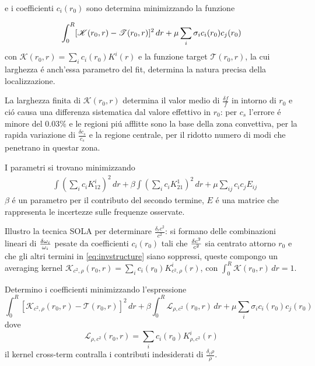 \documentclass[../main.tex]{subfiles}
\begin{document}
e i coefficienti $c_i(r_0)$ sono determina minimizzando la funzione

\begin{equation}\label{eq:SOLAcir0min}
\int_0^R[\mathcal{K}(r_0,r)-\mathcal{T}(r_0,r)]^2\,dr+\mu\sum_i\sigma_ic_i(r_0)c_j(r_0)\\
\end{equation}
con $\mathcal{K}(r_0,r)=\sum_ic_i(r_0)K^i(r)$ e la funzione target $\mathcal{T}(r_0,r)$, la cui larghezza \'e anch'essa parametro del fit, determina la natura precisa della localizzazione.

La larghezza finita di $\mathcal{K}(r_0,r)$ determina il valor medio di $\frac{\delta f}{f}$ in intorno di $r_0$ e ci\'o causa una differenza sistematica  dal valore effettivo in $r_0$: per $c_s$ l'errore \'e minore del $0.03\%$ e le regioni pi\'u afflitte sono la base della zona convettiva, per la rapida variazione di $\frac{\delta c_s}{c_s}$ e la regione centrale, per il ridotto numero di modi che penetrano in questar zona.


\begin{errata}
I parametri si trovano minimizzando
\begin{align*}
&\int(\sum_ic_iK_{12}^i)^2\,dr+\beta\int(\sum_ic_iK_{21}^1)^2\,dr+\mu\sum_{ij}c_ic_jE_{ij}
\end{align*}
$\beta$ \'e un parametro per il contributo del secondo termine, $E$ \'e una matrice che rappresenta le incertezze sulle frequenze osservate.

\end{errata}

Illustro la tecnica SOLA per determinare $\frac{\delta_rc^2}{c^2}$: si formano delle combinazioni lineari di $\frac{\delta \omega_i}{\omega_i}$ pesate da coefficienti $c_i(r_0)$ tali che $\frac{\delta c^2}{c^2}$ sia centrato attorno $r_0$ e che gli altri termini in \eqref{eq:invstructure} siano soppressi, queste compongo un averaging kernel $\mathcal{K}_{c^2,\rho}(r_0,r)=\sum_ic_i(r_0)K_{c^2,\rho}^i(r)$, con $\int_0^R\mathcal{K}(r_0,r)\,dr=1$.

Determino i coefficienti minimizzando l'espressione
\begin{equation}
\int_0^R[\mathcal{K}_{c^2,\rho}(r_0,r)-\mathcal{T}(r_0,r)]^2\,dr+\beta\int_0^R\mathcal{L}_{\rho,c^2}(r_0,r)\,dr+\mu\sum_i\sigma_ic_i(r_0)c_j(r_0)
\end{equation}
dove
\begin{equation}
\mathcal{L}_{\rho,c^2}(r_0,r)=\sum_ic_i(r_0)K_{\rho,c^2}^i(r)
\end{equation}
il kernel cross-term  contralla i contributi indesiderati di $\frac{\delta_r\rho}{\rho}$.
\end{document}
